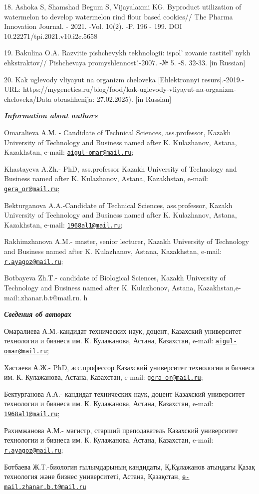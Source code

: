 18. Ashoka S, Shamshad Begum S, Vijayalaxmi KG. Byproduct utilization of
watermelon to develop watermelon rind flour based cookies// The Pharma
Innovation Journal. - 2021. -Vol. 10(2). -P. 196 - 199. DOI
10.22271/tpi.2021.v10.i2c.5658

19. Bakulina O.A. Razvitie pishchevykh tekhnologii:
ispol' zovanie rastitel' nykh
ehkstraktov// Pishchevaya promyshlennost'.-2007. -№ 5.
-S. 32-33. {[}in Russian{]}

20. Kak uglevody vliyayut na organizm cheloveka {[}Ehlektronnyi
resurs{]}.-2019.-URL:
https://mygenetics.ru/blog/food/kak-uglevody-vliyayut-na-organizm-cheloveka/Data
obrashhenija: 27.02.2025). {[}in Russian{]}

\emph{{\bfseries Information about authors}}

Omaralieva A.М. - Candidate of Technical Sciences, ass.professor, Kazakh
University of Technology and Business named after K. Kulazhanov, Astana,
Kazakhstan, e-mail:
\href{mailto:aigul-omar@mail.ru}{\nolinkurl{aigul-omar@mail.ru}};

Khastayeva A.Zh.- PhD, ass.professor Kazakh University of Technology and
Business named after K. Kulazhanov, Astana, Kazakhstan, e-mail:
\href{mailto:gera_or@mail.ru}{\nolinkurl{gera\_or@mail.ru}};

Bekturganova A.A.-Candidate of Technical Sciences, ass.professor, Kazakh
University of Technology and Business named after K. Kulazhanov, Astana,
Kazakhstan, e-mail:
\href{mailto:1968al1@mail.ru}{\nolinkurl{1968al1@mail.ru}};

Rakhimzhanova A.M.- master, senior lecturer, Kazakh University of
Technology and Business named after K. Kulazhanov, Astana, Kazakhstan,
e-mail: \href{mailto:r.ayagoz@mail.ru}{\nolinkurl{r.ayagoz@mail.ru}};

Botbayeva Zh.T.- candidate of Biological Sciences, Kazakh University of
Technology and Business named after K. Kulazhonov, Astana,
Kazakhstan,e-mail:.zhanar.b.t@mail.ru. h

\emph{{\bfseries Сведения об авторах}}

Омаралиева А.М.-кандидат технических наук, доцент, Казахский университет
технологии и бизнеса им. К. Кулажанова, Астана, Казахстан, e-mail:
\href{mailto:aigul-omar@mail.ru}{\nolinkurl{aigul-omar@mail.ru}};

Хастаева А.Ж.- PhD, асс.профессор Казахский университет технологии и
бизнеса им. К. Кулажанова, Астана, Казахстан, e-mail:
\href{mailto:gera_or@mail.ru}{\nolinkurl{gera\_or@mail.ru}};

Бектурганова А.А.- кандидат технических наук, доцент Казахский
университет технологии и бизнеса им. К. Кулажанова, Астана, Казахстан,
e-mail: \href{mailto:1968al1@mail.ru}{\nolinkurl{1968al1@mail.ru}};

Рахимжанова А.М.- магистр, старший преподаватель Казахский университет
технологии и бизнеса им. К. Кулажанова, Астана, Казахстан, e-mail:
\href{mailto:r.ayagoz@mail.ru}{\nolinkurl{r.ayagoz@mail.ru}};

Ботбаева Ж.Т.-биология ғылымдарының кандидаты, Қ.Құлажанов атындағы
Қазақ технология және бизнес университеті, Астана, Қазақстан,
\href{mailto:e-mail.zhanar.b.t@mail.ru}{\nolinkurl{e-mail.zhanar.b.t@mail.ru}}
